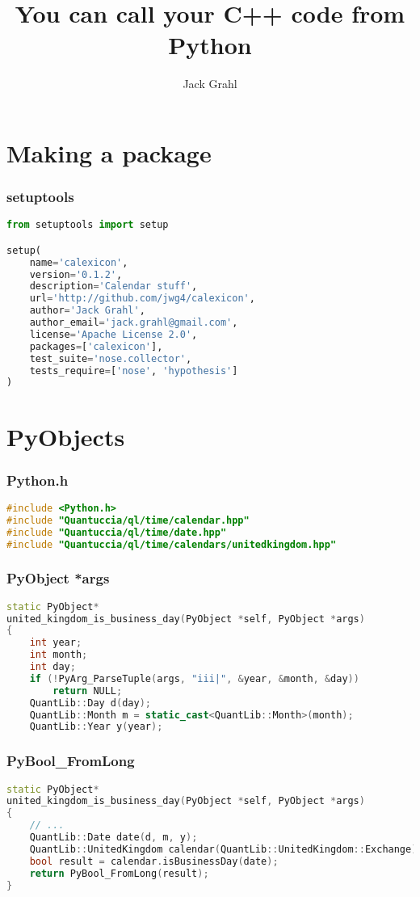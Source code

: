 \documentclass{beamer}
\title{You can call your C++ code from Python}
\author{Jack Grahl}
\institute{PrismFP Analytics}
\begin{document}
	\frame{\titlepage}

	\section{Making a package}

	\begin{frame}[fragile]
		\frametitle{setuptools}
		\begin{lstlisting}[language=Python]
from setuptools import setup

setup(
    name='calexicon',
    version='0.1.2',
    description='Calendar stuff',
    url='http://github.com/jwg4/calexicon',
    author='Jack Grahl',
    author_email='jack.grahl@gmail.com',
    license='Apache License 2.0',
    packages=['calexicon'],
    test_suite='nose.collector',
    tests_require=['nose', 'hypothesis']
)
		\end{lstlisting}
	\end{frame}

	\section{PyObjects}

	\begin{frame}[fragile]
		\frametitle{Python.h}
		\begin{lstlisting}[language=C++]
#include <Python.h>
#include "Quantuccia/ql/time/calendar.hpp"
#include "Quantuccia/ql/time/date.hpp"
#include "Quantuccia/ql/time/calendars/unitedkingdom.hpp"
		\end{lstlisting}
	\end{frame}

	\begin{frame}[fragile]
		\frametitle{PyObject *args}
		\begin{lstlisting}[language=C++]
   static PyObject*
united_kingdom_is_business_day(PyObject *self, PyObject *args)
{
    int year;
    int month;
    int day;
    if (!PyArg_ParseTuple(args, "iii|", &year, &month, &day))
        return NULL;
    QuantLib::Day d(day);
    QuantLib::Month m = static_cast<QuantLib::Month>(month);
    QuantLib::Year y(year);
		\end{lstlisting}
	\end{frame}

	\begin{frame}[fragile]
		\frametitle{PyBool_FromLong}
		\begin{lstlisting}[language=C++]
static PyObject*
united_kingdom_is_business_day(PyObject *self, PyObject *args)
{
    // ...
    QuantLib::Date date(d, m, y);
    QuantLib::UnitedKingdom calendar(QuantLib::UnitedKingdom::Exchange);
    bool result = calendar.isBusinessDay(date);
    return PyBool_FromLong(result);
}
		\end{lstlisting}
	\end{frame}
\end{document}
